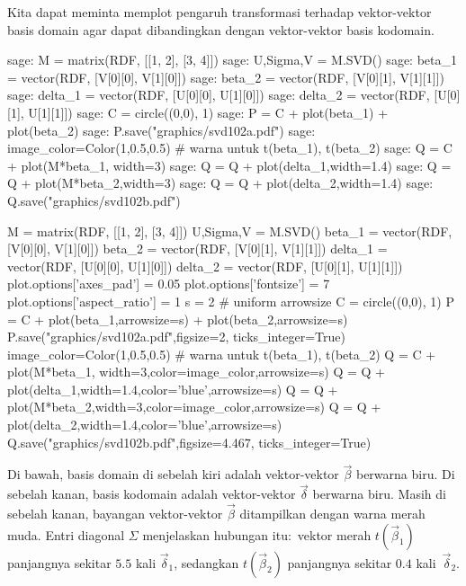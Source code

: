 Kita dapat meminta \Sage{} memplot pengaruh transformasi terhadap
vektor-vektor basis domain agar dapat dibandingkan dengan vektor-vektor
basis kodomain.
\begin{sagecommandline}
sage: M = matrix(RDF, [[1, 2], [3, 4]])
sage: U,Sigma,V = M.SVD()
sage: beta_1 = vector(RDF, [V[0][0], V[1][0]])
sage: beta_2 = vector(RDF, [V[0][1], V[1][1]])
sage: delta_1 = vector(RDF, [U[0][0], U[1][0]])
sage: delta_2 = vector(RDF, [U[0][1], U[1][1]])
sage: C = circle((0,0), 1)
sage: P = C + plot(beta_1) + plot(beta_2)
sage: P.save("graphics/svd102a.pdf")
sage: image_color=Color(1,0.5,0.5)   # warna untuk t(beta_1), t(beta_2)
sage: Q = C + plot(M*beta_1, width=3) 
sage: Q = Q + plot(delta_1,width=1.4) 
sage: Q = Q + plot(M*beta_2,width=3) 
sage: Q = Q + plot(delta_2,width=1.4)
sage: Q.save("graphics/svd102b.pdf")
\end{sagecommandline}
\begin{sagesilent}
M = matrix(RDF, [[1, 2], [3, 4]])
U,Sigma,V = M.SVD()
beta_1 = vector(RDF, [V[0][0], V[1][0]])
beta_2 = vector(RDF, [V[0][1], V[1][1]])
delta_1 = vector(RDF, [U[0][0], U[1][0]])
delta_2 = vector(RDF, [U[0][1], U[1][1]])
plot.options['axes_pad'] = 0.05
plot.options['fontsize'] = 7
plot.options['aspect_ratio'] = 1
s = 2  # uniform arrowsize
C = circle((0,0), 1)
P = C + plot(beta_1,arrowsize=s) + plot(beta_2,arrowsize=s)
P.save("graphics/svd102a.pdf",figsize=2, ticks_integer=True)
image_color=Color(1,0.5,0.5)   # warna untuk t(beta_1), t(beta_2)
Q = C + plot(M*beta_1, width=3,color=image_color,arrowsize=s) 
Q = Q + plot(delta_1,width=1.4,color='blue',arrowsize=s) 
Q = Q + plot(M*beta_2,width=3,color=image_color,arrowsize=s) 
Q = Q + plot(delta_2,width=1.4,color='blue',arrowsize=s)
Q.save("graphics/svd102b.pdf",figsize=4.467, ticks_integer=True)
\end{sagesilent}
Di bawah, basis domain di sebelah kiri adalah vektor-vektor
$\vec{\beta}$ berwarna biru.
Di sebelah kanan, basis kodomain adalah vektor-vektor $\vec{\delta}$ berwarna
biru. Masih di sebelah kanan, bayangan vektor-vektor $\vec{\beta}$
ditampilkan dengan warna merah muda.
Entri diagonal $\Sigma$ menjelaskan hubungan itu:~vektor merah
$t(\vec{\beta}_1)$ panjangnya sekitar $5.5$ kali $\vec{\delta}_1$, sedangkan
$t(\vec{\beta}_2)$ panjangnya sekitar $0.4$ kali~$\vec{\delta}_2$.
